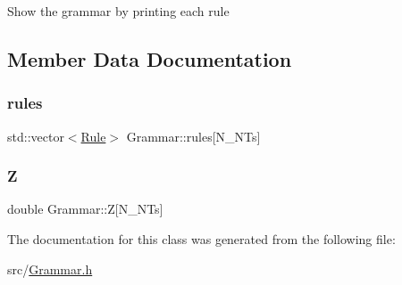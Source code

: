 Show the grammar by printing each rule

\subsection{Member Data Documentation}
\mbox{\label{class_grammar_aae1036bcd35025ff7512252c7aa06e9c}} 
\subsubsection{\texorpdfstring{rules}{rules}}
{\footnotesize\ttfamily std\+::vector$<$\hyperlink{class_rule}{Rule}$>$ Grammar\+::rules\mbox{[}N\+\_\+\+N\+Ts\mbox{]}\hspace{0.3cm}{\ttfamily [protected]}}

\mbox{\label{class_grammar_af55b1376566113fecd05b2c99b9f0014}} 
\subsubsection{\texorpdfstring{Z}{Z}}
{\footnotesize\ttfamily double Grammar\+::Z\mbox{[}N\+\_\+\+N\+Ts\mbox{]}\hspace{0.3cm}{\ttfamily [protected]}}



The documentation for this class was generated from the following file\+:\begin{DoxyCompactItemize}
\item 
src/\hyperlink{_grammar_8h}{Grammar.\+h}\end{DoxyCompactItemize}
